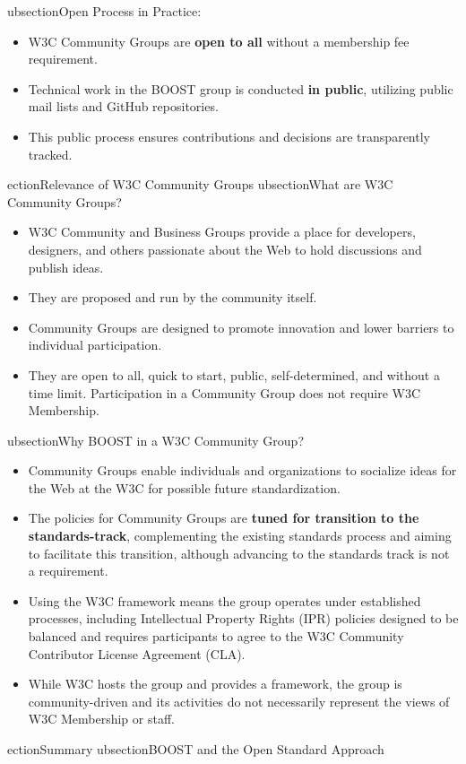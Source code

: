  ubsection{Open Process in Practice:}
\label{sec:org090c586}
\begin{itemize}
\item W3C Community Groups are \textbf{open to all} without a membership fee requirement.
\item Technical work in the BOOST group is conducted \textbf{in public}, utilizing public mail lists and GitHub repositories.
\item This public process ensures contributions and decisions are transparently tracked.
\end{itemize}
 ection{Relevance of W3C Community Groups}
\label{sec:org08f844f}
 ubsection{What are W3C Community Groups?}
\label{sec:orgbe75d4e}
\begin{itemize}
\item W3C Community and Business Groups provide a place for developers, designers, and others passionate about the Web to hold discussions and publish ideas.
\item They are proposed and run by the community itself.
\item Community Groups are designed to promote innovation and lower barriers to individual participation.
\item They are open to all, quick to start, public, self-determined, and without a time limit. Participation in a Community Group does not require W3C Membership.
\end{itemize}
 ubsection{Why BOOST in a W3C Community Group?}
\label{sec:org452c69a}
\begin{itemize}
\item Community Groups enable individuals and organizations to socialize ideas for the Web at the W3C for possible future standardization.
\item The policies for Community Groups are \textbf{tuned for transition to the standards-track}, complementing the existing standards process and aiming to facilitate this transition, although advancing to the standards track is not a requirement.
\item Using the W3C framework means the group operates under established processes, including Intellectual Property Rights (IPR) policies designed to be balanced and requires participants to agree to the W3C Community Contributor License Agreement (CLA).
\item While W3C hosts the group and provides a framework, the group is community-driven and its activities do not necessarily represent the views of W3C Membership or staff.
\end{itemize}
 ection{Summary}
\label{sec:org9024a6e}
 ubsection{BOOST and the Open Standard Approach}
\label{sec:org64bb973}

